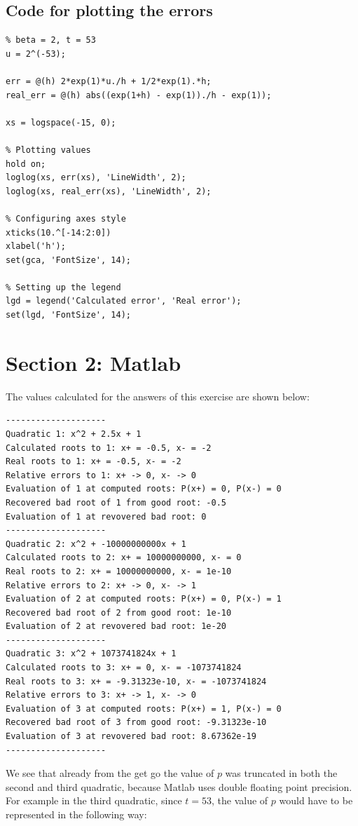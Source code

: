 \documentclass{article}
\begin{document}
\subsection*{Code for plotting the errors}

\begin{verbatim}
% beta = 2, t = 53
u = 2^(-53);

err = @(h) 2*exp(1)*u./h + 1/2*exp(1).*h;
real_err = @(h) abs((exp(1+h) - exp(1))./h - exp(1));

xs = logspace(-15, 0);

% Plotting values
hold on;
loglog(xs, err(xs), 'LineWidth', 2);
loglog(xs, real_err(xs), 'LineWidth', 2);

% Configuring axes style
xticks(10.^[-14:2:0])
xlabel('h');
set(gca, 'FontSize', 14);

% Setting up the legend
lgd = legend('Calculated error', 'Real error');
set(lgd, 'FontSize', 14);
\end{verbatim}

\section*{Section 2: Matlab}

The values calculated for the answers of this exercise are shown below:

\begin{verbatim}
--------------------
Quadratic 1: x^2 + 2.5x + 1
Calculated roots to 1: x+ = -0.5, x- = -2
Real roots to 1: x+ = -0.5, x- = -2
Relative errors to 1: x+ -> 0, x- -> 0
Evaluation of 1 at computed roots: P(x+) = 0, P(x-) = 0
Recovered bad root of 1 from good root: -0.5
Evaluation of 1 at revovered bad root: 0
--------------------
Quadratic 2: x^2 + -10000000000x + 1
Calculated roots to 2: x+ = 10000000000, x- = 0
Real roots to 2: x+ = 10000000000, x- = 1e-10
Relative errors to 2: x+ -> 0, x- -> 1
Evaluation of 2 at computed roots: P(x+) = 0, P(x-) = 1
Recovered bad root of 2 from good root: 1e-10
Evaluation of 2 at revovered bad root: 1e-20
--------------------
Quadratic 3: x^2 + 1073741824x + 1
Calculated roots to 3: x+ = 0, x- = -1073741824
Real roots to 3: x+ = -9.31323e-10, x- = -1073741824
Relative errors to 3: x+ -> 1, x- -> 0
Evaluation of 3 at computed roots: P(x+) = 1, P(x-) = 0
Recovered bad root of 3 from good root: -9.31323e-10
Evaluation of 3 at revovered bad root: 8.67362e-19
--------------------
\end{verbatim}

We see that already from the get go the value of $p$ was truncated
in both the second and third quadratic, because Matlab uses double
floating point precision. For example in the third quadratic,
since $t = 53$, the
value of $p$ would have to be represented in the following way:
\end{document}
